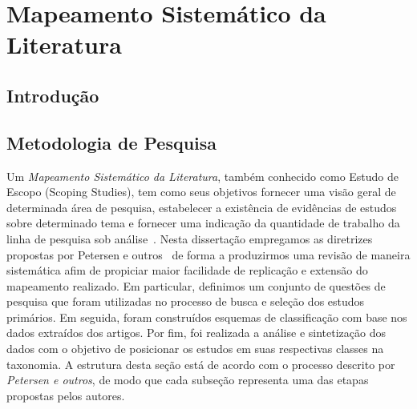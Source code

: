 
\chapter{Mapeamento Sistemático da Literatura}
\label{ch:mapeamento-sistematico}

\section{Introdução}
\label{sec:map-intro}

\section{Metodologia de Pesquisa}
\label{sec:map-metodologia}

Um \textit{Mapeamento Sistemático da Literatura}, também conhecido como Estudo
de Escopo (Scoping Studies), tem como seus objetivos fornecer uma visão geral de
determinada área de pesquisa, estabelecer a existência de evidências de estudos
sobre determinado tema e fornecer uma indicação da quantidade de trabalho da
linha de pesquisa sob
análise~\cite{keele2007guidelines,wohlin2012experimentation}. Nesta dissertação
empregamos as diretrizes propostas por Petersen e outros~\cite{Petersen2008} de
forma a produzirmos uma revisão de maneira sistemática afim de propiciar maior
facilidade de replicação e extensão do mapeamento realizado. Em particular,
definimos um conjunto de questões de pesquisa que foram utilizadas no processo
de busca e seleção dos estudos primários. Em seguida, foram construídos esquemas
de classificação com base nos dados extraídos dos artigos. Por fim, foi
realizada a análise e sintetização dos dados com o objetivo de posicionar os
estudos em suas respectivas classes na taxonomia. A estrutura desta seção está
de acordo com o processo descrito por \textit{Petersen e outros}, de modo que
cada subseção representa uma das etapas propostas pelos autores.

